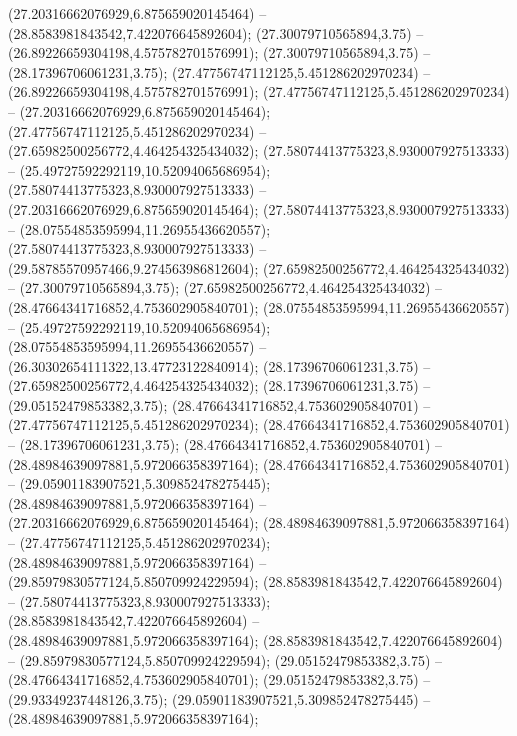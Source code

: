  (27.20316662076929,6.875659020145464) -- (28.8583981843542,7.422076645892604);
 (27.30079710565894,3.75) -- (26.89226659304198,4.575782701576991);
 (27.30079710565894,3.75) -- (28.17396706061231,3.75);
 (27.47756747112125,5.451286202970234) -- (26.89226659304198,4.575782701576991);
 (27.47756747112125,5.451286202970234) -- (27.20316662076929,6.875659020145464);
 (27.47756747112125,5.451286202970234) -- (27.65982500256772,4.464254325434032);
 (27.58074413775323,8.930007927513333) -- (25.49727592292119,10.52094065686954);
 (27.58074413775323,8.930007927513333) -- (27.20316662076929,6.875659020145464);
 (27.58074413775323,8.930007927513333) -- (28.07554853595994,11.26955436620557);
 (27.58074413775323,8.930007927513333) -- (29.58785570957466,9.274563986812604);
 (27.65982500256772,4.464254325434032) -- (27.30079710565894,3.75);
 (27.65982500256772,4.464254325434032) -- (28.47664341716852,4.753602905840701);
 (28.07554853595994,11.26955436620557) -- (25.49727592292119,10.52094065686954);
 (28.07554853595994,11.26955436620557) -- (26.30302654111322,13.47723122840914);
 (28.17396706061231,3.75) -- (27.65982500256772,4.464254325434032);
 (28.17396706061231,3.75) -- (29.05152479853382,3.75);
 (28.47664341716852,4.753602905840701) -- (27.47756747112125,5.451286202970234);
 (28.47664341716852,4.753602905840701) -- (28.17396706061231,3.75);
 (28.47664341716852,4.753602905840701) -- (28.48984639097881,5.972066358397164);
 (28.47664341716852,4.753602905840701) -- (29.05901183907521,5.309852478275445);
 (28.48984639097881,5.972066358397164) -- (27.20316662076929,6.875659020145464);
 (28.48984639097881,5.972066358397164) -- (27.47756747112125,5.451286202970234);
 (28.48984639097881,5.972066358397164) -- (29.85979830577124,5.850709924229594);
 (28.8583981843542,7.422076645892604) -- (27.58074413775323,8.930007927513333);
 (28.8583981843542,7.422076645892604) -- (28.48984639097881,5.972066358397164);
 (28.8583981843542,7.422076645892604) -- (29.85979830577124,5.850709924229594);
 (29.05152479853382,3.75) -- (28.47664341716852,4.753602905840701);
 (29.05152479853382,3.75) -- (29.93349237448126,3.75);
 (29.05901183907521,5.309852478275445) -- (28.48984639097881,5.972066358397164);

